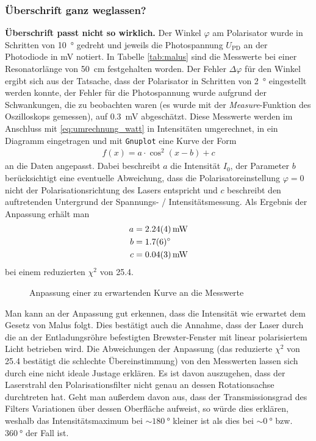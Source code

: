 \documentclass[11pt, a4paper]{article}
\numberwithin{equation}{section}
\begin{document}
\subsubsection{Überschrift ganz weglassen?}
\textbf{Überschrift passt nicht so wirklich.}
Der Winkel $\varphi$ am Polarisator wurde in Schritten von \SI{10}{\degree} gedreht und jeweils die Photospannung $U_\text{PD}$ an der Photodiode in \si{\milli\volt} notiert.
In Tabelle \ref{tab:malus} sind die Messwerte bei einer Resonatorlänge von \SI{50}{\centi\metre} festgehalten worden.
Der Fehler $\Delta\varphi$ für den Winkel ergibt sich aus der Tatsache, dass der Polarisator in Schritten von \SI{2}{\degree} eingestellt werden konnte, der Fehler für die Photospannung wurde aufgrund der Schwankungen, die zu beobachten waren (es wurde mit der \emph{Measure}-Funktion des Oszilloskops gemessen), auf \SI{0.3}{\milli\volt} abgeschätzt.
Diese Messwerte werden im Anschluss mit \eqref{eq:umrechnung_watt} in Intensitäten umgerechnet, in ein Diagramm eingetragen und mit \texttt{Gnuplot} eine Kurve der Form
\begin{align}
f(x) = a\cdot\cos^2(x-b) + c
\end{align}
an die Daten angepasst.
Dabei beschreibt $a$ die Intensität $I_0$, der Parameter $b$ berücksichtigt eine eventuelle Abweichung, dass die Polarisatoreinstellung $\varphi=0$ nicht der Polarisationsrichtung des Lasers entspricht und $c$ beschreibt den auftretenden Untergrund der Spannungs- / Intensitätsmessung.
Als Ergebnis der Anpassung erhält man
\begin{align}
a&=\SI{2.24+-0.04}{\milli\watt}\\
b&=\SI{1.7+-0.6}{\degree}\\
c&=\SI{0.04+-0.03}{\milli\watt}
\end{align}
bei einem reduzierten $\chi^2$ von \num{25.4}.
\begin{figure}
	\centering
	
	\caption{Anpassung einer zu erwartenden Kurve an die Messwerte}
	\label{fig:malus}
\end{figure}
Man kann an der Anpassung gut erkennen, dass die Intensität wie erwartet dem Gesetz von Malus folgt.
Dies bestätigt auch die Annahme, dass der Laser durch die an der Entladungsröhre befestigten Brewster-Fenster mit linear polarisiertem Licht betrieben wird.
Die Abweichungen der Anpassung (das reduzierte $\chi^2$ von \num{25.4} bestätigt die schlechte Übereinstimmung) von den Messwerten lassen sich durch eine nicht ideale Justage erklären.
Es ist davon auszugehen, dass der Laserstrahl den Polarisationsfilter nicht genau an dessen Rotationsachse durchtreten hat.
Geht man außerdem davon aus, dass der Transmissionsgrad des Filters Variationen über dessen Oberfläche aufweist, so würde dies erklären, weshalb das Intensitätsmaximum bei $\sim \SI{180}{\degree}$ kleiner ist als dies bei $\sim \SI{0}{\degree}$ bzw. $\SI{360}{\degree}$ der Fall ist.
\end{document}
